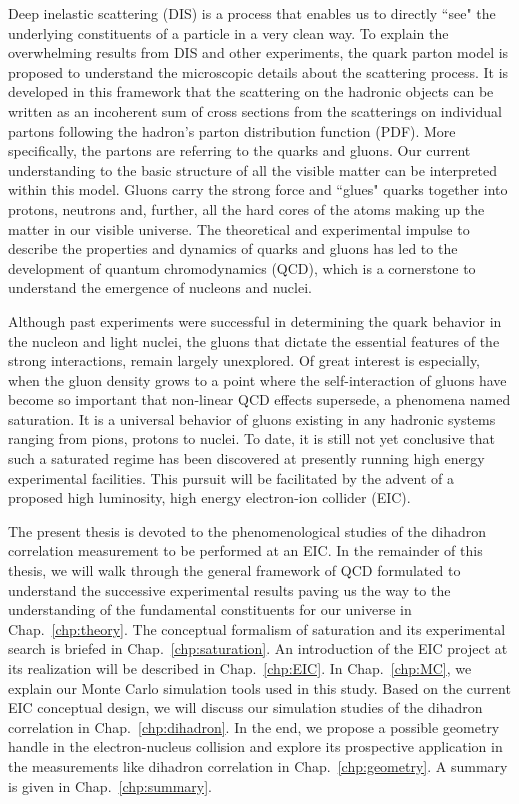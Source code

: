 Deep inelastic scattering (DIS) is a process that enables us to directly ``see"
the underlying constituents of a particle in a very clean way. To explain the
overwhelming results from DIS and other experiments, the quark parton model is
proposed to understand the microscopic details about the scattering process. It
is developed in this framework that the scattering on the hadronic objects can
be written as an incoherent sum of cross sections from the scatterings on
individual partons following the hadron's parton distribution function (PDF).
More specifically, the partons are referring to the quarks and gluons. Our
current understanding to the basic structure of all the visible matter can be
interpreted within this model. Gluons carry the strong force and
``glues" quarks together into protons, neutrons and, further, all the hard
cores of the atoms making up the matter in our visible universe. The theoretical
and experimental impulse to describe the properties and dynamics of quarks and
gluons has led to the development of quantum chromodynamics (QCD), which is a
cornerstone to understand the emergence of nucleons and nuclei.


Although past experiments were successful in determining the quark behavior in
the nucleon and light nuclei, the gluons that dictate the essential features
of the strong interactions, remain largely unexplored. Of great interest is
especially, when the gluon density grows to a point where the self-interaction
of gluons have become so important that non-linear QCD effects supersede, a
phenomena named saturation. It is a universal behavior of gluons existing in any
hadronic systems ranging from pions, protons to nuclei. To date, it is still not
yet conclusive that such a saturated regime has been discovered at presently
running high energy experimental facilities. This pursuit will be facilitated by
the advent of a proposed high luminosity, high energy electron-ion collider (EIC).


The present thesis is devoted to the phenomenological studies of the dihadron
correlation measurement to be performed at an EIC. In the remainder of this
thesis, we will walk through the general framework of QCD formulated to
understand the successive experimental results paving us the way to the
understanding of the fundamental constituents for our universe in
Chap.~\ref{chp:theory}. The conceptual formalism of saturation and its
experimental search is briefed in Chap.~\ref{chp:saturation}. An
introduction of the EIC project at its realization will be described in
Chap.~\ref{chp:EIC}. In Chap.~\ref{chp:MC}, we explain our Monte Carlo
simulation tools used in this study. Based on the current EIC conceptual design,
we will discuss our simulation studies of the dihadron correlation in Chap.~\ref{chp:dihadron}. In the end, we propose a possible geometry
handle in the electron-nucleus collision and explore its prospective
application in the measurements like dihadron correlation in
Chap.~\ref{chp:geometry}. A summary is given in Chap.~\ref{chp:summary}.

